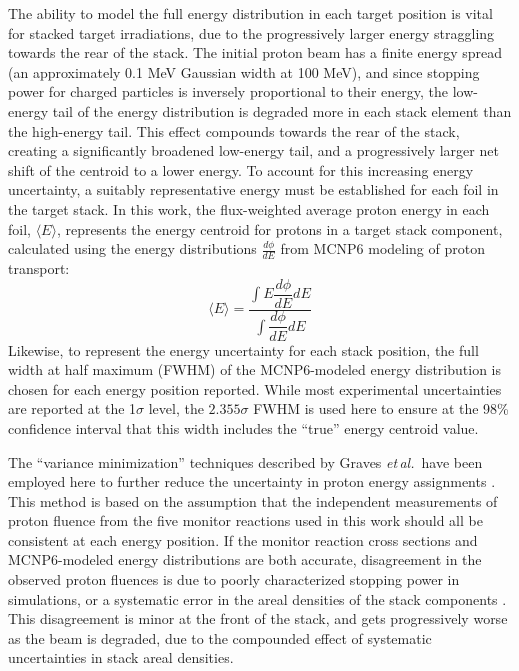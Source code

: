 \documentclass[3p]{elsarticle}
\newcommand{\etal}{\emph{et\,al.}}
\begin{document}
The ability to model the full energy distribution in each target position is vital for stacked target irradiations, due to the progressively larger energy straggling towards the rear of the stack.
The initial proton beam has a finite energy spread (an approximately 0.1 MeV Gaussian width at 100 MeV), and since stopping power for charged particles is inversely proportional to their energy, the low-energy tail of the energy distribution is degraded more in each stack element than the high-energy tail.
This effect compounds  towards the rear of the stack, creating a significantly broadened low-energy tail, and a progressively larger net shift of the centroid to a lower energy. 
To account for this increasing energy uncertainty, a suitably representative energy must be established for  each foil in the target stack.
In this work, the flux-weighted average proton  energy in each foil, $\langle E \rangle$,  represents the energy centroid for protons in a target stack component, calculated using the energy distributions $\frac{d\phi}{dE}$ from MCNP6 modeling of proton transport:
\begin{equation}
\langle E \rangle = \dfrac{{\displaystyle\int E \dfrac{d\phi}{dE} dE}}{{\displaystyle\int \dfrac{d\phi}{dE} dE}}
\end{equation}
Likewise, to represent the energy uncertainty for each stack position, the full width at half maximum (FWHM) of the MCNP6-modeled energy distribution is chosen for each energy position reported.
While most experimental uncertainties are reported at the 1$\sigma$ level, the $2.355\sigma$ FWHM is used here to ensure at the 98\% confidence interval that this width includes  the \enquote{true} energy centroid value.





The \enquote{variance minimization} techniques  described by  Graves \etal\  have been employed here to further reduce the uncertainty in proton energy assignments     \cite{Graves2016}.
This method is based on the assumption that the independent measurements of proton fluence from the five monitor reactions used in this work should all be consistent at each energy position.
If the monitor reaction cross sections and MCNP6-modeled energy distributions are both accurate, disagreement in the  observed proton fluences is due to poorly characterized stopping power in simulations, or a systematic error in the 
areal densities of the stack components \cite{Graves2016,Marus2015}. 
This disagreement is minor at the front of the stack, and gets progressively worse as the beam is degraded, due to the compounded effect of systematic uncertainties in stack areal densities.
\end{document}
